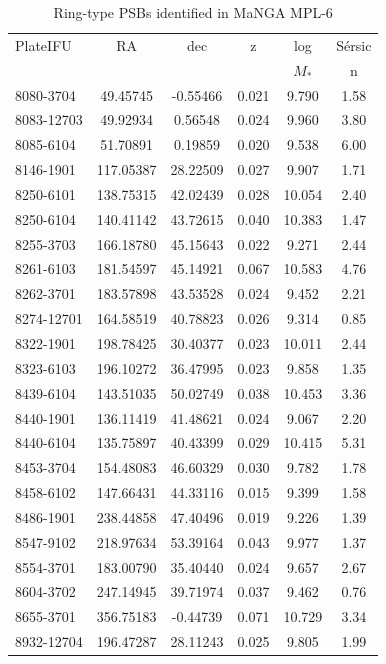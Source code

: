 \begin{table}
\caption{Ring-type PSBs identified in MaNGA MPL-6}
\label{tab:my-RPSBs}
\begin{tabular}{lccccc}
\hline
PlateIFU & RA & dec & z & log & S\'ersic \\
& & & & $M_*$ & n \\
\hline
8080-3704 & 49.45745 & -0.55466 & 0.021 & 9.790 & 1.58 \\
8083-12703 & 49.92934 & 0.56548 & 0.024 & 9.960 & 3.80 \\
8085-6104 & 51.70891 & 0.19859 & 0.020 & 9.538 & 6.00 \\
8146-1901 & 117.05387 & 28.22509 & 0.027 & 9.907 & 1.71 \\
8250-6101 & 138.75315 & 42.02439 & 0.028 & 10.054 & 2.40 \\
8250-6104 & 140.41142 & 43.72615 & 0.040 & 10.383 & 1.47 \\
8255-3703 & 166.18780 & 45.15643 & 0.022 & 9.271 & 2.44 \\
8261-6103 & 181.54597 & 45.14921 & 0.067 & 10.583 & 4.76 \\
8262-3701 & 183.57898 & 43.53528 & 0.024 & 9.452 & 2.21 \\
8274-12701 & 164.58519 & 40.78823 & 0.026 & 9.314 & 0.85 \\
8322-1901 & 198.78425 & 30.40377 & 0.023 & 10.011 & 2.44 \\
8323-6103 & 196.10272 & 36.47995 & 0.023 & 9.858 & 1.35 \\
8439-6104 & 143.51035 & 50.02749 & 0.038 & 10.453 & 3.36 \\
8440-1901 & 136.11419 & 41.48621 & 0.024 & 9.067 & 2.20 \\
8440-6104 & 135.75897 & 40.43399 & 0.029 & 10.415 & 5.31 \\
8453-3704 & 154.48083 & 46.60329 & 0.030 & 9.782 & 1.78 \\
8458-6102 & 147.66431 & 44.33116 & 0.015 & 9.399 & 1.58 \\
8486-1901 & 238.44858 & 47.40496 & 0.019 & 9.226 & 1.39 \\
8547-9102 & 218.97634 & 53.39164 & 0.043 & 9.977 & 1.37 \\
8554-3701 & 183.00790 & 35.40440 & 0.024 & 9.657 & 2.67 \\
8604-3702 & 247.14945 & 39.71974 & 0.037 & 9.462 & 0.76 \\
8655-3701 & 356.75183 & -0.44739 & 0.071 & 10.729 & 3.34 \\
8932-12704 & 196.47287 & 28.11243 & 0.025 & 9.805 & 1.99 \\

\end{tabular}
\end{table}
